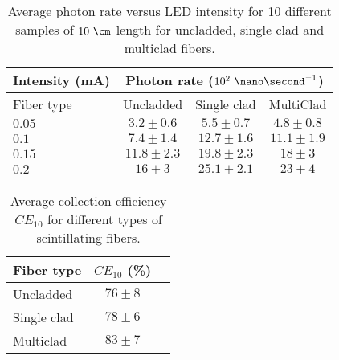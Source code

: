 \begin{table}[htbp]
\centering{}%
\begin{tabular}{lccc}
\toprule 
Intensity (mA) & \multicolumn{3}{c}{Photon rate ($10^{2}~\nano\second^{-1}$)} \tabularnewline
\midrule
Fiber type & Uncladded & Single clad & MultiClad \tabularnewline
\midrule
\midrule
$0.05$ & $3.2 \pm 0.6$ & $5.5 \pm 0.7$ & $4.8 \pm 0.8$ \tabularnewline
$0.1$ & $7.4 \pm 1.4$ & $12.7 \pm 1.6$ & $11.1 \pm 1.9$ \tabularnewline
$0.15$ & $11.8 \pm 2.3$ & $19.8 \pm 2.3$ & $18\pm 3$ \tabularnewline
$0.2$ & $16 \pm 3$ & $25.1 \pm 2.1$ & $23 \pm 4$ \tabularnewline
\bottomrule
\end{tabular}
\caption{Average photon rate versus LED intensity for 10 different samples of $10~\cm$ length for uncladded, single clad and multiclad fibers.}
\label{tab:10DifferentSamplesAlltypes}
\end{table}


\begin{table}[htbp]
\centering{}%
\begin{tabular}{lcc}
\toprule 
Fiber type & $CE_{10}$ (\%) \tabularnewline
\midrule
\midrule 
Uncladded & $76 \pm 8$ \tabularnewline
Single clad & $78 \pm 6$ \tabularnewline
Multiclad & $83 \pm 7$ \tabularnewline
\bottomrule
\end{tabular}
\caption{Average collection efficiency $CE_{10}$ for different types of scintillating fibers.}
\label{tab:CollectionEfficiencyOfFibers}
\end{table}




